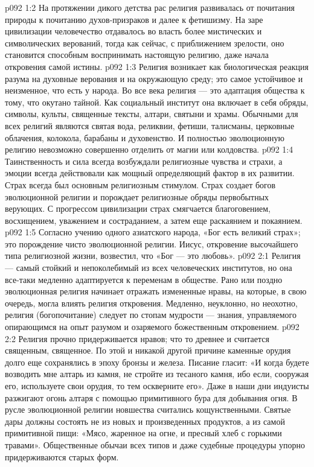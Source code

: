 \vs p092 1:2 На протяжении дикого детства рас религия развивалась от почитания природы к почитанию духов\hyp{}призраков и далее к фетишизму. На заре цивилизации человечество отдавалось во власть более мистических и символических верований, тогда как сейчас, с приближением зрелости, оно становится способным воспринимать настоящую религию, даже начала откровения самой истины.
\vs p092 1:3 Религия возникает как биологическая реакция разума на духовные верования и на окружающую среду; это самое устойчивое и неизменное, что есть у народа. Во все века религия --- это адаптация общества к тому, что окутано тайной. Как социальный институт она включает в себя обряды, символы, культы, священные тексты, алтари, святыни и храмы. Обычными для всех религий являются святая вода, реликвии, фетиши, талисманы, церковные облачения, колокола, барабаны и духовенство. И полностью эволюционную религию невозможно совершенно отделить от магии или колдовства.
\vs p092 1:4 Таинственность и сила всегда возбуждали религиозные чувства и страхи, а эмоции всегда действовали как мощный определяющий фактор в их развитии. Страх всегда был основным религиозным стимулом. Страх создает богов эволюционной религии и порождает религиозные обряды первобытных верующих. С прогрессом цивилизации страх смягчается благоговением, восхищением, уважением и состраданием, а затем еще раскаянием и покаянием.
\vs p092 1:5 Согласно учению одного азиатского народа, «Бог есть великий страх»; это порождение чисто эволюционной религии. Иисус, откровение высочайшего типа религиозной жизни, возвестил, что «Бог --- это любовь».
\vs p092 2:1 Религия --- самый стойкий и непоколебимый из всех человеческих институтов, но она все\hyp{}таки медленно адаптируется к переменам в обществе. Рано или поздно эволюционная религия начинает отражать измененные нравы, на которые, в свою очередь, могла влиять религия откровения. Медленно, неуклонно, но неохотно, религия (богопочитание) следует по стопам мудрости --- знания, управляемого опирающимся на опыт разумом и озаряемого божественным откровением.
\vs p092 2:2 Религия прочно придерживается нравов; что  то древнее и считается священным, священное. По этой и никакой другой причине каменные орудия долго еще сохранялись в эпоху бронзы и железа. Писание гласит: «И когда будете возводить мне алтарь из камня, не стройте из тесаного камня, ибо если, сооружая его, используете свои орудия, то тем оскверните его». Даже в наши дни индуисты разжигают огонь алтаря с помощью примитивного бура для добывания огня. В русле эволюционной религии новшества считались кощунственными. Святые дары должны состоять не из новых и произведенных продуктов, а из самой примитивной пищи: «Мясо, жаренное на огне, и пресный хлеб с горькими травами». Общественные обычаи всех типов и даже судебные процедуры упорно придерживаются старых форм.
